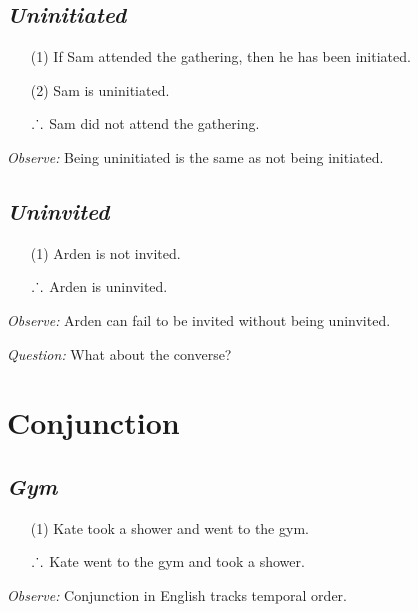 \documentclass[a4paper, 11pt]{article} %
\def\therefore{\ensuremath{\ldotp\dot{}\,\ldotp}}
\begin{document}
\subsection*{\it \textbf{Uninitiated}}

\begin{enumerate}
  \item[(1)] If Sam attended the gathering, then he has been initiated.
  \item[(2)] Sam is uninitiated.
  \item[\therefore] Sam did not attend the gathering.
\end{enumerate}

\noindent
\textit{Observe:} Being uninitiated is the same as not being initiated.





\subsection*{\it \textbf{Uninvited}}

\begin{enumerate}
  \item[(1)] Arden is not invited.
  \item[\therefore] Arden is uninvited.
\end{enumerate}

\noindent
\textit{Observe:} Arden can fail to be invited without being uninvited.
\vspace{.05in}

\noindent
\textit{Question:} What about the converse?





\section*{Conjunction}

\subsection*{\it \textbf{Gym}}

\begin{enumerate}
  \item[(1)] Kate took a shower and went to the gym.
  \item[\therefore] Kate went to the gym and took a shower.
\end{enumerate}

\noindent
\textit{Observe:} Conjunction in English tracks temporal order.
\vspace{.05in}
\end{document}
